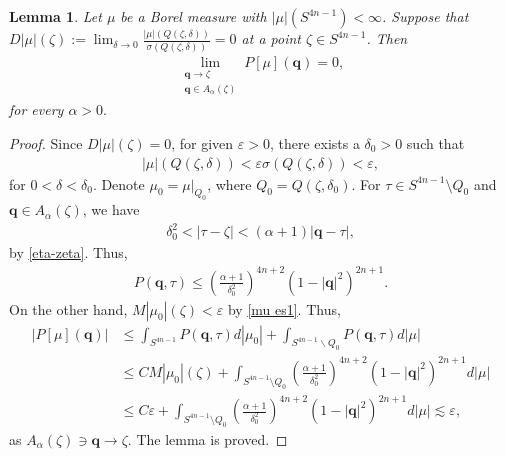 \documentclass[a4paper,11pt]{amsart}
\numberwithin{equation}{section}
\newtheorem{lem}{Lemma}[section]
\begin{document}
\begin{lem}\label{lem D=0}
Let $\mu$ be a Borel measure with $|\mu|(S^{4n-1})<\infty$. Suppose that $D|\mu|(\zeta):=\lim_{\delta\rightarrow 0}\frac{|\mu|(Q(\zeta,\delta))}{\sigma(Q(\zeta,\delta))}=0$ at a point $\zeta\in S^{4n-1}$. Then
\begin{equation*}\begin{aligned}
\lim_{\substack{\mathbf{q}\rightarrow\zeta\\ \mathbf{q}\in A_{\alpha}(\zeta)}} P[\mu](\mathbf{q})=0,
\end{aligned}\end{equation*}
for every $\alpha>0.$
\end{lem}
\begin{proof}
Since $D|\mu|(\zeta)=0$, for given $\varepsilon>0$, there exists a $\delta_0>0$ such that
\begin{equation}\begin{aligned}\label{mu es1}
|\mu|(Q(\zeta,\delta))<\varepsilon\sigma(Q(\zeta,\delta))<\varepsilon,
\end{aligned}\end{equation}
for $0<\delta<\delta_0$. Denote $\mu_0=\mu|_{Q_0}$, where $Q_0=Q(\zeta,\delta_0)$.
For $\tau\in S^{4n-1}\setminus Q_0$ and $\mathbf{q}\in A_{\alpha}(\zeta)$, we have
\begin{equation*}\begin{aligned}
\delta_0^2<|\tau-\zeta|<(\alpha+1)|\mathbf{q}-\tau|,
\end{aligned}\end{equation*}
by \eqref{eta-zeta}.
Thus,
\begin{equation*}\begin{aligned}
P(\mathbf{q},\tau)\leq\left(\frac{\alpha+1}{\delta_0^2}\right)^{4n+2}(1-|\mathbf{q}|^2)^{2n+1}.
\end{aligned}\end{equation*}
On the other hand, $M|\mu_0|(\zeta)< \varepsilon$ by \eqref{mu es1}. Thus,
\begin{equation*}\begin{aligned}
\left|P[\mu](\mathbf{q})\right|&\leq\int_{S^{4n-1}}P(\mathbf{q},\tau)d\left|\mu_0\right|+\int_{S^{4n-1}\backslash Q_0}P(\mathbf{q},\tau)d\left|\mu\right|\\
&\leq CM|\mu_0|(\zeta)+\int_{S^{4n-1}\setminus Q_0}\left(\frac{\alpha+1}{\delta_0^2}\right)^{4n+2}(1-|\mathbf{q}|^2)^{2n+1}d|\mu|\\
&\leq C\varepsilon+\int_{S^{4n-1}\setminus Q_0}\left(\frac{\alpha+1}{\delta_0^2}\right)^{4n+2}(1-|\mathbf{q}|^2)^{2n+1}d|\mu|\lesssim \varepsilon,
\end{aligned}\end{equation*}
as $A_{\alpha}(\zeta)\ni\mathbf{q}\rightarrow\zeta$. The lemma is proved.
\end{proof}
\end{document}
